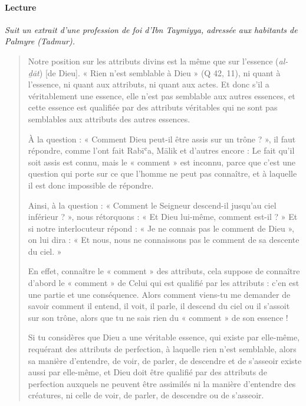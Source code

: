 \paragraph{Lecture}



\emph{Suit un extrait d'une profession de foi d'Ibn Taymiyya, adressée
aux habitants de Palmyre (Tadmur).}



\begin{quote}
    
 
Notre position  sur les attributs divins est la même que sur l'essence
(\emph{al-ḏāt}) {[}de Dieu{]}. « Rien n'est semblable à Dieu » (Q 42,
11), ni quant à l'essence, ni quant aux attributs, ni quant aux actes.
Et donc s'il a véritablement une essence, elle n'est pas semblable aux
autres essences, et cette essence est qualifiée par des attributs
véritables qui ne sont pas semblables aux attributs des autres essences.

À la question : « Comment Dieu peut-il être assis sur un trône ? », il
faut répondre, comme l'ont fait Rabīʿa, Mālik et
d'autres encore : Le fait qu'il soit assis est connu, mais le « comment » est inconnu, parce que c'est une question qui porte sur ce que l'homme
ne peut pas connaître, et à laquelle il est donc impossible de répondre.

Ainsi, à la question : « Comment le Seigneur descend-il jusqu'au ciel
inférieur ? », nous rétorquons : « Et Dieu lui-même, comment est-il ? »
Et si notre interlocuteur répond : « Je ne connais pas le comment de
Dieu », on lui dira : « Et nous, nous ne connaissons pas le comment de
sa descente du ciel. »

En effet, connaître le « comment » des attributs, cela suppose de
connaître d'abord le
« comment » de Celui qui est qualifié par les attributs : c'en est une
partie et une conséquence. Alors comment viens-tu me demander de savoir
comment il entend, il voit, il parle, il descend du ciel ou il s'assoit
sur son trône, alors que tu ne sais rien du « comment » de son essence !

Si tu considères que Dieu a une véritable essence, qui existe par
elle-même, requérant des attributs de perfection, à laquelle rien n'est
semblable, alors sa manière d'entendre, de voir, de parler, de descendre
et de s'asseoir existe aussi par elle-même, et Dieu doit être qualifié
par des attributs de perfection auxquels ne peuvent être assimilés ni la
manière d'entendre des créatures, ni celle de voir, de parler, de
descendre ou de s'asseoir.
\end{quote}
 

